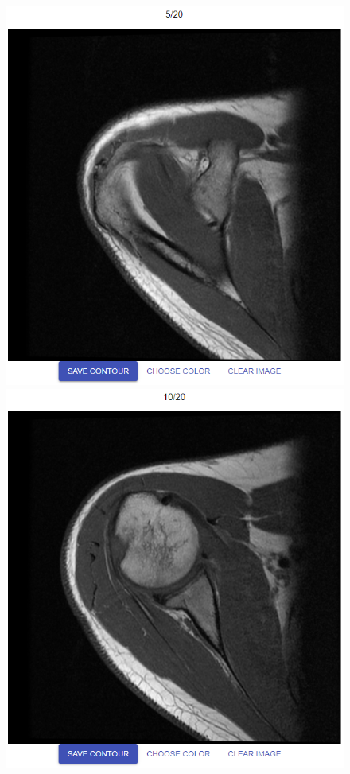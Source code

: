 \documentclass[a4paper,11pt,twoside,openright]{report}
\theoremstyle{definition}
\begin{document}
\begin{figure}[h!]
\begin{center}
	\begin{center}
		\includegraphics[width=1.0\textwidth]{185}
	\end{center}
	\endminipage\hfill
	\begin{center}
		\includegraphics[width=1.0\textwidth]{184}

\end{center}
\end{center}
\end{figure}
\end{document}
